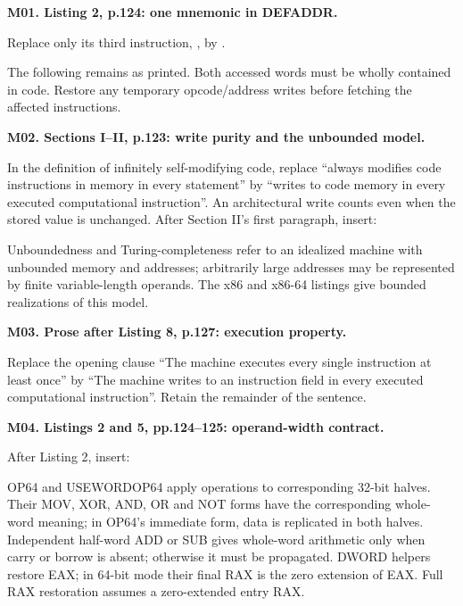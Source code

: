 \documentclass[10pt,a4paper]{article}
\newcommand{\code}[1]{\texttt{\detokenize{#1}}}
\newcommand{\itemtitle}[1]{\par\vspace{0pt}\textbf{#1}\par\nopagebreak}
\begin{document}
\fontsize{9}{9}\selectfont
\raggedright
\itemtitle{M01. Listing 2, p.124: one mnemonic in DEFADDR.}
Replace only its third instruction, \code{mov acmltr, [acmltr]},
by \code{xchg acmltr, [acmltr]}.\par
The following \code{MOFFSMOV(labelname, addr)} remains as printed.
Both accessed words must be wholly contained in code. Restore any temporary
opcode/address writes before fetching the affected instructions.

\itemtitle{M02. Sections I--II, p.123: write purity and the unbounded model.}
In the definition of infinitely self-modifying code, replace
``always modifies code instructions in memory in every statement'' by
``writes to code memory in every executed computational instruction''.
An architectural write counts even when the stored value is unchanged.
After Section II's first paragraph, insert:
{\fontsize{9}{9}\selectfont\par
Unboundedness and Turing-completeness refer to an idealized machine with
unbounded memory and addresses; arbitrarily large addresses may be represented
by finite variable-length operands. The x86 and x86-64 listings give bounded
realizations of this model.
\par}

\itemtitle{M03. Prose after Listing 8, p.127: execution property.}
Replace the opening clause ``The machine executes every single instruction at
least once'' by ``The machine writes to an instruction field in every executed
computational instruction''. Retain the remainder of the sentence.

\itemtitle{M04. Listings 2 and 5, pp.124--125: operand-width contract.}
After Listing 2, insert:
{\fontsize{9}{9}\selectfont\par
OP64 and USEWORDOP64 apply operations to corresponding 32-bit halves.
Their MOV, XOR, AND, OR and NOT forms have the corresponding whole-word
meaning; in OP64's immediate form, data is replicated in both halves.
Independent half-word ADD or SUB gives whole-word arithmetic only when
carry or borrow is absent; otherwise it must be propagated.
DWORD helpers restore EAX; in 64-bit mode their final RAX is the zero
extension of EAX. Full RAX restoration assumes a zero-extended entry RAX.
\par}
\end{document}
